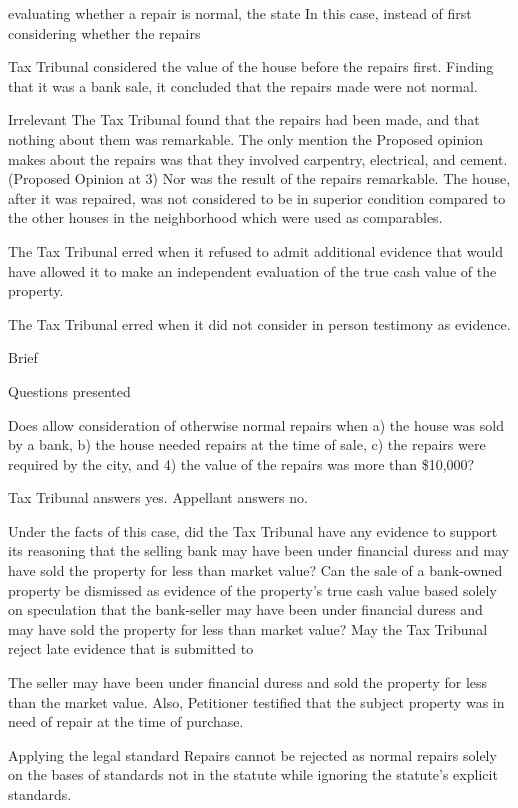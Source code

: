  evaluating whether a repair is normal, the state
In this case, instead of first considering whether the repairs 

Tax Tribunal considered the value of the house before the repairs first. Finding that it was a bank sale, it concluded that the repairs made were not normal.


Irrelevant
The Tax Tribunal found that the repairs had been made, and that nothing about them was remarkable. The only mention the Proposed opinion makes about the repairs was that they involved carpentry, electrical, and cement. (Proposed Opinion at 3) Nor was the result of the repairs remarkable. The house, after it was repaired, was not considered to be in superior condition compared to the other houses in the neighborhood which were used as comparables. 

The Tax Tribunal erred when it refused to admit additional evidence that would have allowed it to make an independent evaluation of the true cash value of the property. 

The Tax Tribunal erred when it did not consider in person testimony as evidence.



Brief 
 
Questions presented 
 
Does  allow consideration of otherwise normal repairs when a) the house was sold by a bank, b) the house needed repairs at the time of sale, c) the repairs were required by the city, and 4) the value of the repairs was more than \$10,000? 
	
	Tax Tribunal answers yes. Appellant answers no. 
 
Under the facts of this case, did the Tax Tribunal have any evidence to support its reasoning that the selling bank may have been under financial duress and may have sold the property for less than market value? 
Can the sale of a bank-owned property be dismissed as evidence of the property's true cash value based solely on speculation that the bank-seller may have been under financial duress and may have sold the property for less than market value? 
May the Tax Tribunal reject late evidence that is submitted to 
 
The seller may have been under financial duress and sold the property for less than the market value. Also, Petitioner testified that the subject property was in need of repair at the time of purchase. 
 
 
Applying the legal standard 
Repairs cannot be rejected as normal repairs solely on the bases of standards not in the statute while ignoring the statute's explicit standards. 
 
